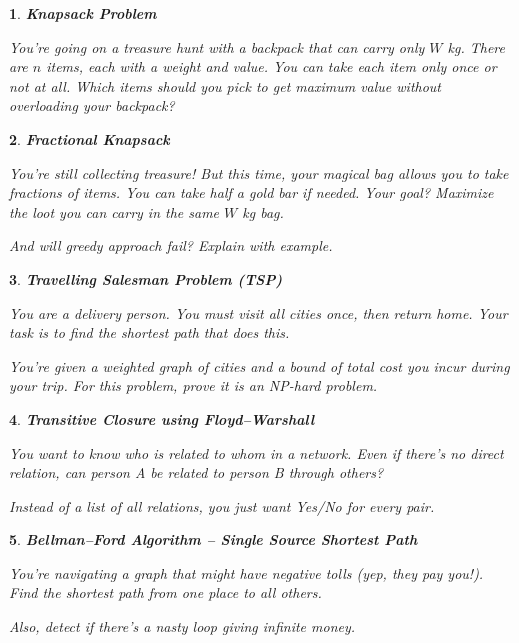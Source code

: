 \documentclass[%
addpoints]{exam}
\theoremstyle{problem}
\newtheorem{p}{}
\begin{document}
\begin{p}
\textbf{Knapsack Problem}

You're going on a treasure hunt with a backpack that can carry only $W$ kg. There are $n$ items, each with a weight and value. You can take each item only once or not at all. Which items should you pick to get maximum value without overloading your backpack?
\hfill \end{p}

\begin{p}
\textbf{Fractional Knapsack}

You're still collecting treasure! But this time, your magical bag allows you to take fractions of items. You can take half a gold bar if needed. Your goal? Maximize the loot you can carry in the same $W$ kg bag.

And will greedy approach fail? Explain with example.
\hfill \end{p}

\begin{p}
\textbf{Travelling Salesman Problem (TSP)}

You are a delivery person. You must visit all cities once, then return home. Your task is to find the shortest path that does this.

You're given a weighted graph of cities and a bound of total cost you incur during your trip. For this problem, prove it is an NP-hard problem.
\hfill \end{p}

\begin{p}
\textbf{Transitive Closure using Floyd–Warshall}

You want to know who is related to whom in a network. Even if there's no direct relation, can person A be related to person B through others?

Instead of a list of all relations, you just want Yes/No for every pair.
\hfill \end{p}

\begin{p}
\textbf{Bellman–Ford Algorithm – Single Source Shortest Path}

You're navigating a graph that might have negative tolls (yep, they pay you!). Find the shortest path from one place to all others.

Also, detect if there's a nasty loop giving infinite money.
\hfill \end{p}

\end{document}
